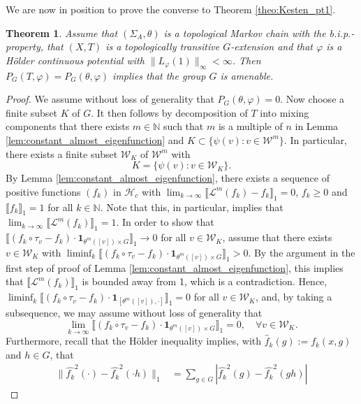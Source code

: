 \documentclass[10pt]{article}
\newtheorem{theorem}{Theorem}[section]
\theoremstyle{mystyle}
\newcommand{\N}{\mathbb{N}}
\newcommand{\cW}{\mathcal{W}}
\newcommand{\cL}{\mathcal{L}}
\newcommand{\cH}{\mathcal{H}}
\newcommand{\te}{{\theta}}
\newcommand{\Sig}{{\Sigma}}
\newcommand{\1}{\mathbf{1}}
\begin{document}
We are now in position to prove the converse to Theorem \ref{theo:Kesten_pt1}. 


\begin{theorem}\label{theo:Kesten_reverse}  Assume that $(\Sig_A,\te)$ is a topological Markov chain with the b.i.p.-property, that $(X,T)$ is a topologically transitive $G$-extension and that $\varphi$ is a Hölder continuous potential with $\|L_\varphi(1)\|_\infty < \infty$. Then $P_G(T,\varphi)=P_G(\te,\varphi)$ implies that the group $G$ is amenable.
\end{theorem}

\begin{proof} We assume without loss of generality that $P_G(\te,\varphi)=0$.  Now choose a finite subset $K$ of $G$. It then follows by decomposition of $T$ into mixing components that there exists $m \in \N$ such that $m$ is a multiple of $n$ in Lemma \ref{lem:constant_almost_eigenfunction} and
$K \subset \{ \psi(v) : v \in \cW^{m}\}$. In particular, there exists a finite subset $\cW_K$ of $\cW^m$ with 
\[ K = \{  \psi(v) : v \in \cW_K \}.\]  
By Lemma \ref{lem:constant_almost_eigenfunction}, there exists a sequence of positive functions $(f_k)$ in $\cH_c$ with  $\lim_{k\to \infty} \llbracket \cL^m(f_k)-f_k \rrbracket_1 =0 $, $f_k \geq 0$  and $\llbracket f_k \rrbracket_1 =1$ for all $k \in \N$. Note that this, in particular, implies that $\lim_{k\to \infty} \llbracket \cL^{m}(f_k) \rrbracket_1 =1$. 
In order to show that $\llbracket (f_k \circ \tau_v - f_k)\cdot \1_{\te^m([v])\times G} \rrbracket_1 \to 0$ for all $v \in \cW_K$, assume that there exists $v \in \cW_K$ with $ \liminf_k \llbracket (f_k \circ \tau_v - f_k)\cdot \1_{\te^m([v])\times G} \rrbracket_1 >0$. By the argument in the first step of proof of Lemma \ref{lem:constant_almost_eigenfunction}, this implies that $ \llbracket \cL^{m}(f_k) \rrbracket_1 $ is bounded away from 1, which is a contradiction. Hence, $ \liminf_k \llbracket (f_k \circ \tau_v - f_k)\cdot \1_{[\te^m([v]),\cdot]} \rrbracket_1 =0$ for all $v \in \cW_K$, and, by taking a subsequence, we may assume without loss of generality that
\[ \lim_{k\to \infty} \llbracket (f_k \circ \tau_v - f_k)\cdot \1_{{\te^m([v])\times G}} \rrbracket_1 =0,  \quad \forall v \in \cW_K.\]
Furthermore, recall that the Hölder inequality implies, with $\hat{f}_k(g):= f_k(x,g)$ and $h\in G$, that
\begin{align}
\nonumber
\|\hat{f_k}^2(\cdot) - \hat{f_k}^2(\cdot h)\|_1 & = \sum_{g \in G}|\hat{f_k}^2(g) - \hat{f_k}^2(gh)| 

\end{align}
\end{proof}
\end{document}
